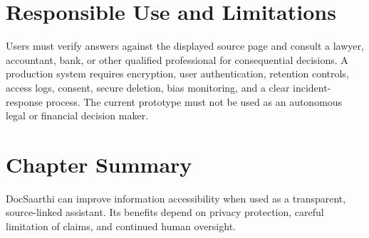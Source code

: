 \section{Responsible Use and Limitations}
Users must verify answers against the displayed source page and consult a lawyer, accountant, bank, or other qualified professional for consequential decisions. A production system requires encryption, user authentication, retention controls, access logs, consent, secure deletion, bias monitoring, and a clear incident-response process. The current prototype must not be used as an autonomous legal or financial decision maker.

\section*{Chapter Summary}
DocSaarthi can improve information accessibility when used as a transparent, source-linked assistant. Its benefits depend on privacy protection, careful limitation of claims, and continued human oversight.
